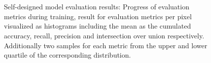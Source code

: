 \documentclass[lettersize,journal]{IEEEtran}
\begin{document}
\begin{figure}[h]
  \centering
  \\
  \\
  \caption{Self-designed model evaluation results: Progress of evaluation metrics during training, result for evaluation metrics per pixel visualized as histograms including the mean as the cumulated accuracy, recall, precision and intersection over union respectively. Additionally two samples for each metric from the upper and lower quartile of the corresponding distribution.}
  \label{fig:eval_sd}
\end{figure}
\end{document}
